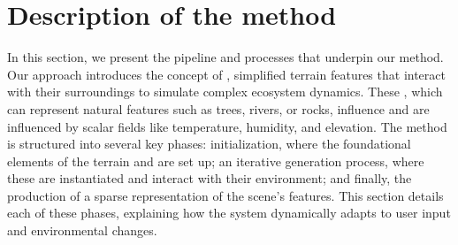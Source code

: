 







\section{Description of the method}
\label{sec:env-obj_pipeline}

In this section, we present the pipeline and processes that underpin our method. Our approach introduces the concept of , simplified terrain features that interact with their surroundings to simulate complex ecosystem dynamics. These , which can represent natural features such as trees, rivers, or rocks, influence and are influenced by scalar fields like temperature, humidity, and elevation. The method is structured into several key phases: initialization, where the foundational elements of the terrain and  are set up; an iterative generation process, where these  are instantiated and interact with their environment; and finally, the production of a sparse representation of the scene's features. This section details each of these phases, explaining how the system dynamically adapts to user input and environmental changes.

